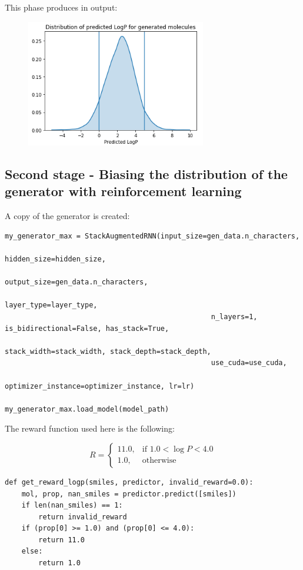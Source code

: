 \documentclass[a4paper]{article}
\begin{document}
This phase produces in output:

\begin{figure}[htbp]
		\centering
			\includegraphics[width=0.70\textwidth]{unbiased.png}
		\label{fig:unbiased}
	\end{figure}

\subsection{Second stage - Biasing the distribution of the generator with reinforcement learning}\label{sec:Second stage - Biasing the distribution of the generator with reinforcement learning}

A copy of the generator is created:

\begin{lstlisting}
my_generator_max = StackAugmentedRNN(input_size=gen_data.n_characters, 
												 hidden_size=hidden_size,
												 output_size=gen_data.n_characters, 
												 layer_type=layer_type,
												 n_layers=1, is_bidirectional=False, has_stack=True,
												 stack_width=stack_width, stack_depth=stack_depth, 
												 use_cuda=use_cuda, 
												 optimizer_instance=optimizer_instance, lr=lr)

my_generator_max.load_model(model_path)
\end{lstlisting}

The reward function used here is the following:

$$
R =  \begin{cases} 11.0, & \mbox{if } 1.0 < \log P < 4.0 \\ 1.0, & \mbox{otherwise}  \end{cases}
$$

\begin{lstlisting}
def get_reward_logp(smiles, predictor, invalid_reward=0.0):
    mol, prop, nan_smiles = predictor.predict([smiles])
    if len(nan_smiles) == 1:
        return invalid_reward
    if (prop[0] >= 1.0) and (prop[0] <= 4.0):
        return 11.0
    else:
        return 1.0
\end{lstlisting}
\end{document}
